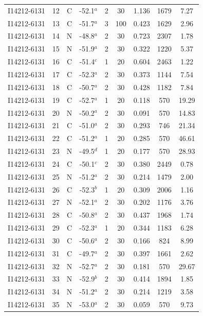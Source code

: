 \begin{table}
\begin{tabular}{ccccccccc}
I14212-6131 & 12 & C & -52.1$^{a}$ & 2 & 30 & 1.136 & 1679 & 7.27 \\
I14212-6131 & 13 & C & -51.7$^{a}$ & 3 & 100 & 0.423 & 1629 & 2.96 \\
I14212-6131 & 14 & N & -48.8$^{a}$ & 2 & 30 & 0.723 & 2307 & 1.78 \\
I14212-6131 & 15 & N & -51.9$^{a}$ & 2 & 30 & 0.322 & 1220 & 5.37 \\
I14212-6131 & 16 & C & -51.4$^{c}$ & 1 & 20 & 0.604 & 2463 & 1.22 \\
I14212-6131 & 17 & C & -52.3$^{a}$ & 2 & 30 & 0.373 & 1144 & 7.54 \\
I14212-6131 & 18 & C & -50.7$^{a}$ & 2 & 30 & 0.428 & 1182 & 7.84 \\
I14212-6131 & 19 & C & -52.7$^{a}$ & 1 & 20 & 0.118 & 570 & 19.29 \\
I14212-6131 & 20 & N & -50.2$^{a}$ & 2 & 30 & 0.091 & 570 & 14.83 \\
I14212-6131 & 21 & C & -51.0$^{a}$ & 2 & 30 & 0.293 & 746 & 21.34 \\
I14212-6131 & 22 & C & -51.2$^{a}$ & 1 & 20 & 0.285 & 570 & 46.61 \\
I14212-6131 & 23 & N & -49.5$^{d}$ & 1 & 20 & 0.177 & 570 & 28.93 \\
I14212-6131 & 24 & C & -50.1$^{c}$ & 2 & 30 & 0.380 & 2449 & 0.78 \\
I14212-6131 & 25 & N & -51.2$^{a}$ & 2 & 30 & 0.214 & 1479 & 2.00 \\
I14212-6131 & 26 & C & -52.3$^{b}$ & 1 & 20 & 0.309 & 2006 & 1.16 \\
I14212-6131 & 27 & N & -52.1$^{a}$ & 2 & 30 & 0.202 & 1176 & 3.76 \\
I14212-6131 & 28 & C & -50.8$^{a}$ & 2 & 30 & 0.437 & 1968 & 1.74 \\
I14212-6131 & 29 & C & -52.3$^{a}$ & 1 & 20 & 0.344 & 1183 & 6.28 \\
I14212-6131 & 30 & C & -50.6$^{a}$ & 2 & 30 & 0.166 & 824 & 8.99 \\
I14212-6131 & 31 & C & -49.7$^{a}$ & 2 & 30 & 0.397 & 1661 & 2.62 \\
I14212-6131 & 32 & N & -52.7$^{a}$ & 2 & 30 & 0.181 & 570 & 29.67 \\
I14212-6131 & 33 & N & -52.9$^{b}$ & 2 & 30 & 0.414 & 1894 & 1.85 \\
I14212-6131 & 34 & N & -51.2$^{a}$ & 2 & 30 & 0.214 & 1219 & 3.58 \\
I14212-6131 & 35 & N & -53.0$^{a}$ & 2 & 30 & 0.059 & 570 & 9.73 \\

\end{tabular}
\end{table}
